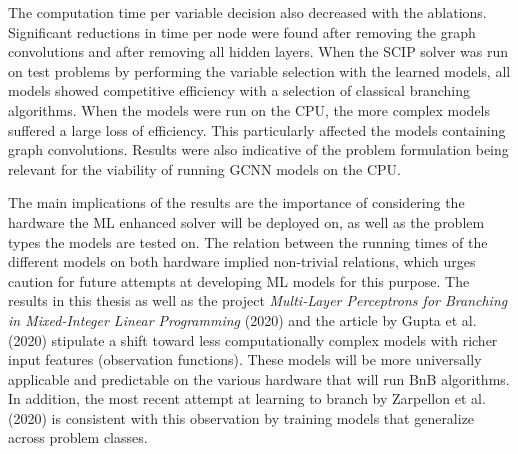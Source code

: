 The computation time per variable decision also decreased with the ablations. Significant reductions in time per node were found after removing the graph convolutions and after removing all hidden layers. When the \gls{SCIP} solver was run on test problems by performing the variable selection with the learned models, all models showed competitive efficiency with a selection of classical branching algorithms. When the models were run on the \gls{CPU}, the more complex models suffered a large loss of efficiency. This particularly affected the models containing graph convolutions. Results were also indicative of the problem formulation being relevant for the viability of running \gls{GCNN} models on the \gls{CPU}. 

The main implications of the results are the importance of considering the hardware the \gls{ML} enhanced solver will be deployed on, as well as the problem types the models are tested on. The relation between the running times of the different models on both hardware implied non-trivial relations, which urges caution for future attempts at developing \gls{ML} models for this purpose. The results in this thesis as well as the project \textit{Multi-Layer Perceptrons for Branching in Mixed-Integer Linear Programming} (2020) and the article by Gupta et al. (2020) \cite{gupta2020hybrid} stipulate a shift toward less computationally complex models with richer input features (observation functions). These models will be more universally applicable and predictable on the various hardware that will run \gls{BnB} algorithms. In addition, the most recent attempt at learning to branch by Zarpellon et al. (2020) \cite{zarpellon2020parameterizing} is consistent with this observation by training models that generalize across problem classes.

